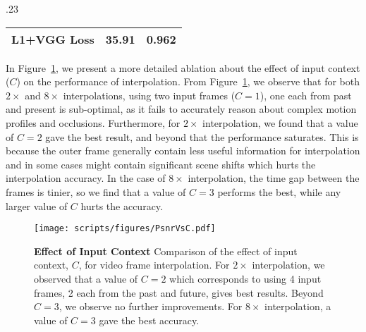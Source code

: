 \documentclass[10pt,twocolumn,letterpaper]{article}
\newcommand{\figref}[1]{Figure~\ref{#1}}
\newcommand{\Ours}{FLAVR}
\newcommand{\twox}{$2\times$}
\newcommand{\eightx}{$8\times$}
\begin{document}
\begin{table*}[h]
\begin{subtable}[t]{.23\textwidth}
{\begin{tabular}{l|cc}
L1+VGG Loss      &	35.91   &	0.962 \\
\bottomrule
\end{tabular}}
\captionsetup{width=.9\textwidth}
\label{tab:lossFn}
\end{subtable}
\captionsetup{width=\textwidth}
\vspace{-8pt}
\caption{{\bf Ablation results} for \Ours{} architecture on  different backbones,  fusion methods,  temporal striding, and  loss functions.}
\label{tab:ablations}
\vspace{-8pt}
\end{table*} In \figref{fig:effectOfC}, we present a more detailed ablation about the effect of input context ($C$) on the performance of interpolation. From \figref{fig:effectOfC}, we observe that for both \twox{} and \eightx{} interpolations, using two input frames ($C=1$), one each from past and present is sub-optimal, as it fails to accurately reason about complex motion profiles and occlusions. Furthermore, for \twox{} interpolation, we found that a value of $C=2$ gave the best result, and beyond that the performance saturates. This is because the outer frame generally contain less useful information for interpolation and in some cases might contain significant scene shifts which hurts the interpolation accuracy. In the case of \eightx{} interpolation, the time gap between the frames is tinier, so we find that a value of $C=3$ performs the best, while any larger value of $C$ hurts the accuracy. 


\begin{figure}
    \begin{center}
    \texttt{[image: scripts/figures/PsnrVsC.pdf]}
    \end{center}
    \caption{{\bf Effect of Input Context} Comparison of the effect of input context, $C$, for video frame interpolation. For \twox{} interpolation, we observed that a value of $C=2$ which corresponds to using 4 input frames, 2 each from the past and future, gives best results. Beyond $C=3$, we observe no further improvements. For \eightx{} interpolation, a value of $C=3$ gave the best accuracy. }
    \label{fig:effectOfC}
\end{figure}
\end{document}
